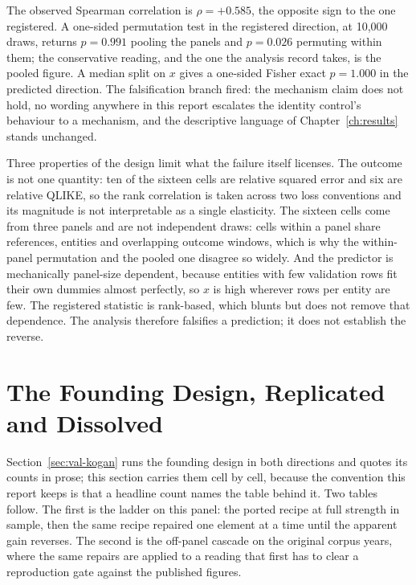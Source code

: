 The observed Spearman correlation is $\rho = +0.585$, the opposite sign to the
one registered. A one-sided permutation test in the registered direction, at
10{,}000 draws, returns $p = 0.991$ pooling the panels and $p = 0.026$
permuting within them; the conservative reading, and the one the analysis record
takes, is the pooled figure. A median split on $x$ gives a one-sided Fisher
exact $p = 1.000$ in the predicted direction. The falsification branch fired:
the mechanism claim does not hold, no wording anywhere in this report escalates
the identity control's behaviour to a mechanism, and the descriptive language of
Chapter~\ref{ch:results} stands unchanged.

Three properties of the design limit what the failure itself licenses. The
outcome is not one quantity: ten of the sixteen cells are relative squared error
and six are relative QLIKE, so the rank correlation is taken across two loss
conventions and its magnitude is not interpretable as a single elasticity. The
sixteen cells come from three panels and are not independent draws: cells within
a panel share references, entities and overlapping outcome windows, which is why
the within-panel permutation and the pooled one disagree so widely. And the
predictor is mechanically panel-size dependent, because entities with few
validation rows fit their own dummies almost perfectly, so $x$ is high wherever
rows per entity are few. The registered statistic is rank-based, which blunts
but does not remove that dependence. The analysis therefore falsifies a
prediction; it does not establish the reverse.

\FloatBarrier
\section{The Founding Design, Replicated and Dissolved}
\label{app:res:kogan}

Section~\ref{sec:val-kogan} runs the founding design in both directions and
quotes its counts in prose; this section carries them cell by cell, because
the convention this report keeps is that a headline count names the table
behind it. Two tables follow. The first is the ladder on this panel: the
ported recipe at full strength in sample, then the same recipe repaired one
element at a time until the apparent gain reverses. The second is the
off-panel cascade on the original corpus years, where the same repairs are
applied to a reading that first has to clear a reproduction gate against the
published figures.

